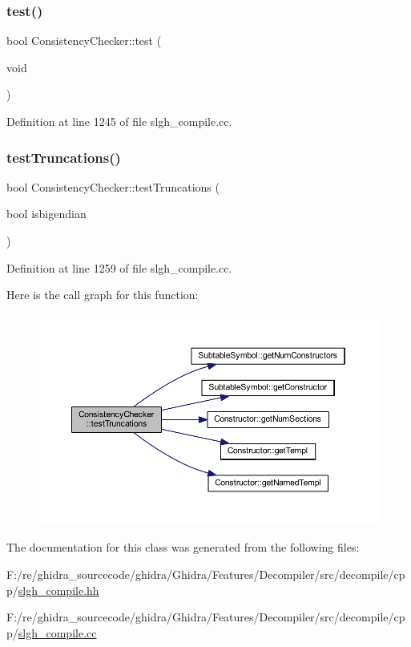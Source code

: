 \subsubsection{\texorpdfstring{test()}{test()}}
{\footnotesize\ttfamily bool Consistency\+Checker\+::test (\begin{DoxyParamCaption}\item[{void}]{ }\end{DoxyParamCaption})}



Definition at line 1245 of file slgh\+\_\+compile.\+cc.

\mbox{\label{class_consistency_checker_a0002274529b2524ceae6c2ddfcdf31eb}} 
\subsubsection{\texorpdfstring{testTruncations()}{testTruncations()}}
{\footnotesize\ttfamily bool Consistency\+Checker\+::test\+Truncations (\begin{DoxyParamCaption}\item[{bool}]{isbigendian }\end{DoxyParamCaption})}



Definition at line 1259 of file slgh\+\_\+compile.\+cc.

Here is the call graph for this function\+:
\nopagebreak
\begin{figure}[H]
\begin{center}
\leavevmode
\includegraphics[width=350pt]{class_consistency_checker_a0002274529b2524ceae6c2ddfcdf31eb_cgraph}
\end{center}
\end{figure}


The documentation for this class was generated from the following files\+:\begin{DoxyCompactItemize}
\item 
F\+:/re/ghidra\+\_\+sourcecode/ghidra/\+Ghidra/\+Features/\+Decompiler/src/decompile/cpp/\mbox{\hyperlink{slgh__compile_8hh}{slgh\+\_\+compile.\+hh}}\item 
F\+:/re/ghidra\+\_\+sourcecode/ghidra/\+Ghidra/\+Features/\+Decompiler/src/decompile/cpp/\mbox{\hyperlink{slgh__compile_8cc}{slgh\+\_\+compile.\+cc}}\end{DoxyCompactItemize}
